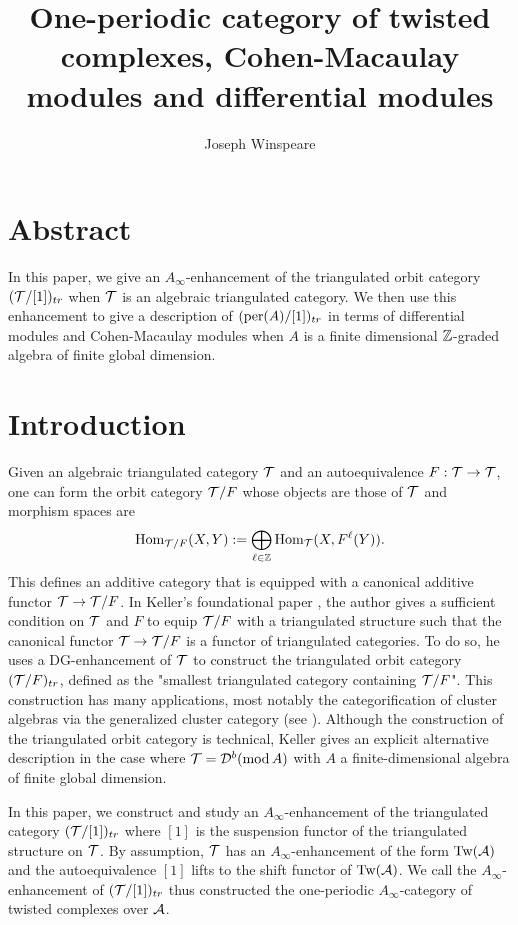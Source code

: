 \documentclass[12pt]{article}
\title{One-periodic category of twisted complexes, Cohen-Macaulay modules and differential modules}
\author{Joseph Winspeare}
\date{ }
\begin{document}
	\maketitle
	
	\section*{Abstract}
	
	In this paper, we give an $A_\infty$-enhancement of the triangulated orbit category $({\cal{T}}/[1])_{tr}$ when ${\cal{T}}$ is an algebraic triangulated category. We then use this enhancement to give a description of $(\textup{per}(A)/[1])_{tr}$ in terms of differential modules and Cohen-Macaulay modules when $A$ is a finite dimensional $\mathbb{Z}$-graded algebra of finite global dimension.
	
	\tableofcontents
	
	\section*{Introduction}
	
	Given an algebraic triangulated category ${\cal{T}}$ and an autoequivalence $F: {\cal{T}} \to {\cal{T}}$, one can form the orbit category ${\cal{T}}/F$ whose objects are those of ${\cal{T}}$ and morphism spaces are
	\[\textup{Hom}_{{\cal{T}}/F}(X,Y):= \bigoplus_{\ell \in \mathbb{Z}} \textup{Hom}_{\cal{T}}(X,F^\ell (Y)).\]
	This defines an additive category that is equipped with a canonical additive functor ${\cal{T}} \to {\cal{T}}/F$. In Keller's foundational paper \cite{KelOrb}, the author gives a sufficient condition on ${\cal{T}}$ and $F$ to equip ${\cal{T}}/F$ with a triangulated structure such that the canonical functor ${\cal{T}} \to {\cal{T}}/F$ is a functor of triangulated categories. To do so, he uses a DG-enhancement of ${\cal{T}}$ to construct the triangulated orbit category $({\cal{T}}/F)_{tr}$, defined as the "smallest triangulated category containing ${\cal{T}}/F$". This construction has many applications, most notably the categorification of cluster algebras via the generalized cluster category (see \cite{KelOrb,Ami_thesis,KelCY,Guo,KelDef}). Although the construction of the triangulated orbit category is technical, Keller gives an explicit alternative description in the case where ${\cal{T}} = {\cal{D}}^b(\textup{mod} \, A)$ with $A$ a finite-dimensional algebra of finite global dimension.
	
	In this paper, we construct and study an $A_\infty$-enhancement of the triangulated category $({\cal{T}}/[1])_{tr}$ where $[1]$ is the suspension functor of the triangulated structure on ${\cal{T}}$. By assumption, ${\cal{T}}$ has an $A_\infty$-enhancement of the form $\textup{Tw}({\cal{A}})$ and the autoequivalence $[1]$ lifts to the shift functor of $\textup{Tw}({\cal{A}})$. We call the $A_\infty$-enhancement of $({\cal{T}}/[1])_{tr}$ thus constructed the one-periodic $A_\infty$-category of twisted complexes over ${\cal{A}}$.
	
\end{document}
